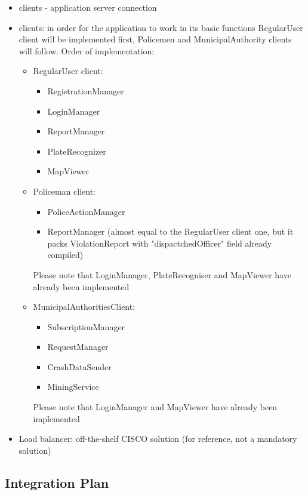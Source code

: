 \begin{itemize}
	\item clients - application server connection
	\item clients: in order for the application to work in its basic functions RegularUser client will be implemented first, Policemen and MunicipalAuthority clients will follow.\newline
	Order of implementation:
		\begin{itemize}
			\item RegularUser client:
			\begin{itemize}
				\item RegistrationManager
				\item LoginManager
				\item ReportManager
				\item PlateRecognizer
				\item MapViewer
			\end{itemize}
			\newpage
			\item Policeman client:
			\begin{itemize}
				\item PoliceActionManager 
				\item ReportManager (almost equal to the RegularUser client one, but it packs ViolationReport with "dispactchedOfficer" field already compiled)
			\end{itemize}
			Please note that LoginManager, PlateRecogniser and MapViewer have already been implemented
			\item MunicipalAuthoritiesClient:
				\begin{itemize}
					\item SubscriptionManager
					\item RequestManager
					\item CrashDataSender
					\item MiningService
				\end{itemize}
			Please note that LoginManager and MapViewer have already been implemented 
			\end{itemize}
	\item Load balancer: off-the-shelf CISCO solution (for reference, not a mandatory solution)
	\end{itemize} 

\subsection{Integration Plan}
